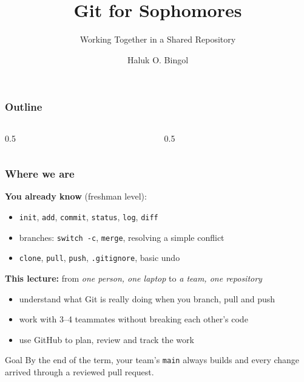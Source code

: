 \documentclass[aspectratio=169,10pt,compress]{beamer}
\title{Git for Sophomores}
\subtitle{Working Together in a Shared Repository}
\author[Bingol]{Haluk O. Bingol}
\institute[FCIS]{
    Faculty of Computer and Information Sciences\\
    Yeditepe University
}
\date{}
\newcommand{\cmd}[1]{\texttt{\color{gitred}#1}}
\begin{document}
\begin{frame}[t,fragile]
  \titlepage
\end{frame}

\begin{frame}[t,fragile] \frametitle{Outline}
  \begin{columns}[T]
    \begin{column}{0.5\textwidth}
      \tableofcontents[sections={1-5}]
    \end{column}
    \begin{column}{0.5\textwidth}
      \tableofcontents[sections={6-10}]
    \end{column}
  \end{columns}
\end{frame}

\begin{frame}[t,fragile] \frametitle{Where we are}
  \textbf{You already know} (freshman level):
  \begin{itemize}
    \item \cmd{init}, \cmd{add}, \cmd{commit}, \cmd{status}, \cmd{log}, \cmd{diff}
    \item branches: \cmd{switch -c}, \cmd{merge}, resolving a simple conflict
    \item \cmd{clone}, \cmd{pull}, \cmd{push}, \texttt{.gitignore}, basic undo
  \end{itemize}

  \vspace{0.5em}
  \textbf{This lecture:} from \emph{one person, one laptop} to \emph{a team, one repository}
  \begin{itemize}
    \item understand what Git is really doing when you branch, pull and push
    \item work with 3--4 teammates without breaking each other's code
    \item use GitHub to plan, review and track the work
  \end{itemize}

  \vspace{0.5em}
  \begin{block}{Goal}
    By the end of the term, your team's \texttt{main} always builds and every
    change arrived through a reviewed pull request.
  \end{block}
\end{frame}
\end{document}
